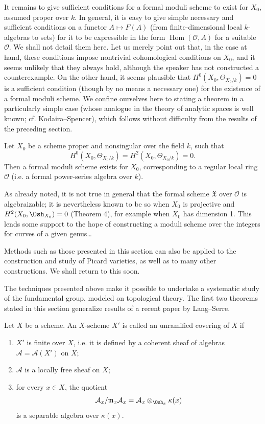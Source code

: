 It remains to give sufficient conditions for a formal moduli scheme to exist
for $X_0$, assumed proper over $k$. In general, it is easy to give simple
necessary and sufficient conditions on a functor $A\longmapsto F(A)$ (from
finite-dimensional local $k$-algebras to sets) for it to be expressible in the
form $\operatorname{Hom}(\mathcal O,A)$ for a suitable $\mathcal O$. We shall
not detail them here. Let us merely point out that, in the case at hand, these
conditions impose nontrivial cohomological conditions on $X_0$, and it seems
unlikely that they always hold, although the speaker has not constructed a
counterexample. On the other hand, it seems plausible that
$H^0(X_0,\Theta_{X_0/k})=0$ is a sufficient condition (though by no means a
necessary one) for the existence of a formal moduli scheme. We confine
ourselves here to stating a theorem in a particularly simple case (whose
analogue in the theory of analytic spaces is well known; cf.
Kodaira--Spencer), which follows without difficulty from the results of the
preceding section.

 Let $X_0$ be a scheme proper and nonsingular over the
field $k$, such that
\[
  H^0(X_0,\Theta_{X_0/k})=H^2(X_0,\Theta_{X_0/k})=0.
\]
Then a formal moduli scheme exists for $X_0$, corresponding to a regular local
ring $\mathcal O$ (i.e. a formal power-series algebra over $k$).

As already noted, it is not true in general that the formal scheme
$\mathfrak X$ over $\mathcal O$ is algebraizable; it is nevertheless known to
be so when $X_0$ is projective and $H^2(X_0,\Osh_{X_0})=0$ (Theorem 4), for
example when $X_0$ has dimension 1. This lends some support to the hope of
constructing a moduli scheme over the integers for curves of a given
genus\ldots{}

Methods such as those presented in this section can also be applied to the
construction and study of Picard varieties, as well as to many other
constructions. We shall return to this soon.


The techniques presented above make it possible to undertake a systematic
study of the fundamental group, modeled on topological theory. The first two
theorems stated in this section generalize results of a recent paper by
Lang--Serre.

Let $X$ be a scheme. An $X$-scheme $X'$ is called an unramified covering
of $X$ if
\begin{enumerate}
  \item[\textit{i.}] $X'$ is finite over $X$, i.e. it is defined by a coherent
    sheaf of algebras $\mathcal A=\mathcal A(X')$ on $X$;
  \item[\textit{ii.}] $\mathcal A$ is a locally free sheaf on $X$;
  \item[\textit{iii.}] for every $x\in X$, the quotient
    \[
      \mathcal A_x/\mathfrak m_x\mathcal A_x
      =\mathcal A_x\otimes_{\Osh_x}\kappa(x)
    \]
    is a separable algebra over $\kappa(x)$.
\end{enumerate}

